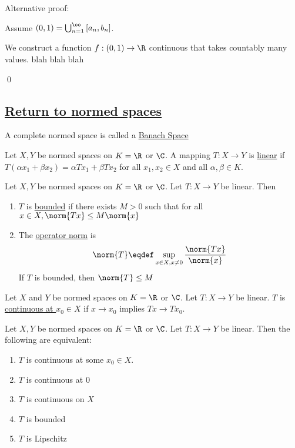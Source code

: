 \documentclass[x11names,reqno,14pt]{extarticle}
\newcommand{\seq}[2][\oo]{_{#2 = 1}^#1}
\newcommand{\bigcupn}[1][\oo]{\bigcup\seq[#1]{n}}
\begin{document}
Alternative proof:

Assume $(0, 1) = \bigcupn\,[a_n,b_n]$. 

We construct a function $f:(0,1)\to\R$ continuous that takes countably many values. blah blah blah

\qed

\subsection*{\underline{Return to normed spaces}}


A complete normed space is called a \underline{Banach Space}

 Let $X, Y$ be normed spaces on $K = \R$ or $\C$. A mapping $T:X\to Y$ is \underline{linear} if $T(\alpha x_1 + \beta x_2) = \alpha Tx_1 + \beta Tx_2$ for all $x_1, x_2 \in X$ and all $\alpha,\beta\in K$.


Let $X, Y$ be normed spaces on $K = \R$ or $\C$. Let $T:X\to Y$ be linear. Then
\begin{enumerate}

\item $T$ is \underline{bounded} if there exists $M>0$ such that for all $x \in X, \norm{Tx}\leq M\norm{x}$

\item The \underline{operator norm} is 
\[
\norm{T}\eqdef \sup_{x\in X, x\neq0}\frac{\norm{Tx}}{\norm{x}}
\]
If $T$ is bounded, then $\norm{T}\leq M$
\end{enumerate}


Let $X$ and $Y$ be normed spaces on $K = \R$ or $\C$. Let $T:X\to Y$ be linear. $T$ is \underline{continuous at $x_0 \in X$} if $x\to x_0$ implies $Tx\to Tx_0$.

\thm

Let $X, Y$ be normed spaces on $K = \R$ or $\C$. Let $T:X\to Y$ be linear. Then the following are equivalent:
\begin{enumerate}

\item $T$ is continuous at some $x_0 \in X$. 
\item $T$ is continuous at 0
\item $T$ is continuous on $X$
\item $T$ is bounded
\item $T$ is Lipschitz

\end{enumerate}
\end{document}
